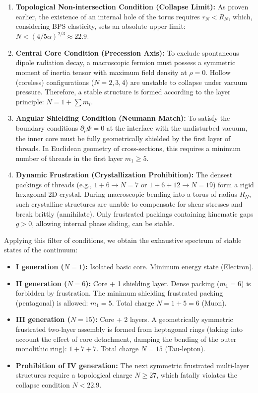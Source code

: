 \documentclass[11pt,a4paper]{article}
\begin{document}
	\begin{enumerate}
		\item \textbf{Topological Non-intersection Condition (Collapse Limit):} As proven earlier, the existence of an internal hole of the torus requires $r_N < R_N$, which, considering BPS elasticity, sets an absolute upper limit: $N < (4 / 5\alpha)^{2/3} \approx 22.9$.
		
		\item \textbf{Central Core Condition (Precession Axis):} To exclude spontaneous dipole radiation decay, a macroscopic fermion must possess a symmetric moment of inertia tensor with maximum field density at $\rho = 0$. Hollow (coreless) configurations ($N=2, 3, 4$) are unstable to collapse under vacuum pressure. Therefore, a stable structure is formed according to the layer principle: $N = 1 + \sum m_i$.
		
		\item \textbf{Angular Shielding Condition (Neumann Match):} To satisfy the boundary conditions $\partial_\rho \Phi = 0$ at the interface with the undisturbed vacuum, the inner core must be fully geometrically shielded by the first layer of threads. In Euclidean geometry of cross-sections, this requires a minimum number of threads in the first layer $m_1 \ge 5$.
		
		\item \textbf{Dynamic Frustration (Crystallization Prohibition):} The densest packings of threads (e.g., $1+6 \to N=7$ or $1+6+12 \to N=19$) form a rigid hexagonal 2D crystal. During macroscopic bending into a torus of radius $R_N$, such crystalline structures are unable to compensate for shear stresses and break brittly (annihilate). Only frustrated packings containing kinematic gaps $g > 0$, allowing internal phase sliding, can be stable.
	\end{enumerate}
	
	Applying this filter of conditions, we obtain the exhaustive spectrum of stable states of the continuum:
	\begin{itemize}
		\item \textbf{I generation ($N=1$):} Isolated basic core. Minimum energy state (Electron).
		\item \textbf{II generation ($N=6$):} Core + 1 shielding layer. Dense packing ($m_1=6$) is forbidden by frustration. The minimum shielding frustrated packing (pentagonal) is allowed: $m_1 = 5$. Total charge $N = 1 + 5 = 6$ (Muon).
		\item \textbf{III generation ($N=15$):} Core + 2 layers. A geometrically symmetric frustrated two-layer assembly is formed from heptagonal rings (taking into account the effect of core detachment, damping the bending of the outer monolithic ring): $1 + 7 + 7$. Total charge $N = 15$ (Tau-lepton).
		\item \textbf{Prohibition of IV generation:} The next symmetric frustrated multi-layer structures require a topological charge $N \ge 27$, which fatally violates the collapse condition $N < 22.9$.
	\end{itemize}
	
\end{document}
